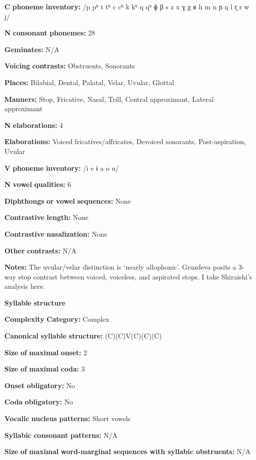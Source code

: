 \begin{styleBody}
\textbf{C} \textbf{phoneme} \textbf{inventory:} /p pʰ t tʰ c cʰ k kʰ q qʰ ɸ β s z x ɣ χ ʁ h m n ɲ ŋ l r̥ r w j/

\textbf{N} \textbf{consonant} \textbf{phonemes:} 28

\textbf{Geminates:} N/A

\textbf{Voicing} \textbf{contrasts:} Obstruents, Sonorants

\textbf{Places:} Bilabial, Dental, Palatal, Velar, Uvular, Glottal

\textbf{Manners:} Stop, Fricative, Nasal, Trill, Central approximant, Lateral approximant

\textbf{N} \textbf{elaborations:} 4

\textbf{Elaborations:} Voiced fricatives/affricates, Devoiced sonorants, Post-aspiration, Uvular

\textbf{V} \textbf{phoneme} \textbf{inventory:} /i e ɨ a o u/

\textbf{N} \textbf{vowel} \textbf{qualities:} 6

\textbf{Diphthongs} \textbf{or} \textbf{vowel} \textbf{sequences:} None

\textbf{Contrastive} \textbf{length:} None

\textbf{Contrastive} \textbf{nasalization:} None

\textbf{Other} \textbf{contrasts:} N/A

\textbf{Notes:} The uvular/velar distinction is ‘nearly allophonic’. Gruzdeva posits a 3-way stop contrast between voiced, voiceless, and aspirated stops. I take Shiraishi’s analysis here.

\textbf{Syllable} \textbf{structure}

\textbf{Complexity} \textbf{Category:} Complex

\textbf{Canonical} \textbf{syllable} \textbf{structure:} (C)(C)V(C)(C)(C) \citep[29-30]{Shiraishi2006}

\textbf{Size} \textbf{of} \textbf{maximal} \textbf{onset:} 2

\textbf{Size} \textbf{of} \textbf{maximal} \textbf{coda:} 3

\textbf{Onset} \textbf{obligatory:} No

\textbf{Coda} \textbf{obligatory:} No

\textbf{Vocalic} \textbf{nucleus} \textbf{patterns:} Short vowels

\textbf{Syllabic} \textbf{consonant} \textbf{patterns:} N/A

\textbf{Size} \textbf{of} \textbf{maximal} \textbf{word{}-marginal sequences with syllabic obstruents:} N/A


\end{styleBody}
